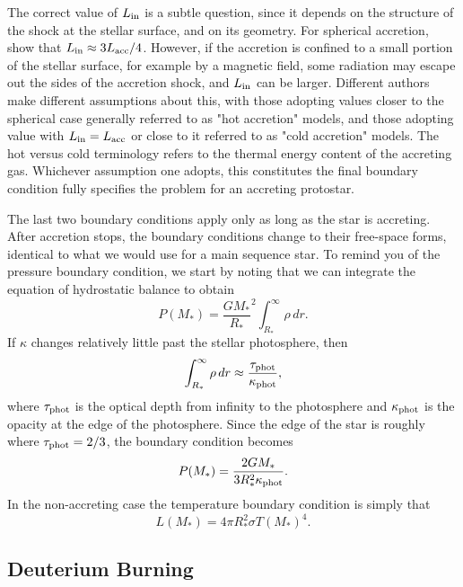 The correct value of $L_{\rm in}$ is a subtle question, since it depends on the structure of the shock at the stellar surface, and on its geometry. For spherical accretion, \citet{stahler80a, stahler80b, stahler81a} show that $L_{\rm in}\approx 3 L_{\rm acc}/4$. However, if the accretion is confined to a small portion of the stellar surface, for example by a magnetic field, some radiation may escape out the sides of the accretion shock, and $L_{\rm in}$ can be larger. Different authors make different assumptions about this, with those adopting values closer to the spherical case generally referred to as "hot accretion" models, and those adopting value with $L_{\rm in} = L_{\rm acc}$ or close to it referred to as "cold accretion" models. The hot versus cold terminology refers to the thermal energy content of the accreting gas. Whichever assumption one adopts, this constitutes the final boundary condition fully specifies the problem for an accreting protostar.

The last two boundary conditions apply only as long as the star is accreting. After accretion stops, the boundary conditions change to their free-space forms, identical to what we would use for a main sequence star.
To remind you of the pressure boundary condition, we start by noting that we can integrate the equation of hydrostatic balance to obtain
\begin{equation}
P(M_*) = \frac{G M_*}{R_*}^2 \int_{R_*}^{\infty} \rho \, dr.
\end{equation}
If $\kappa$ changes relatively little past the stellar photosphere, then 
\begin{equation}
\int _{R_*}^{\infty} \rho \, dr \approx \frac{\tau_{\rm phot}}{\kappa_{\rm phot}},
\end{equation}
where $\tau_{\rm phot}$ is the optical depth from infinity to the photosphere and $\kappa_{\rm phot}$ is the opacity at the edge of the photosphere. Since the edge of the star is roughly where $\tau_{\rm phot} = 2/3$, the boundary condition becomes
\begin{equation}
\label{pbound2}
P(M_*) = \frac{2 G M_*}{3 R_*^2 \kappa_{\rm phot}}.
\end{equation}
In the non-accreting case the temperature boundary condition is simply that
\begin{equation}
\label{lbound2}
L(M_*) = 4\pi R_*^2 \sigma T(M_*)^4.
\end{equation}

\subsection{Deuterium Burning}

